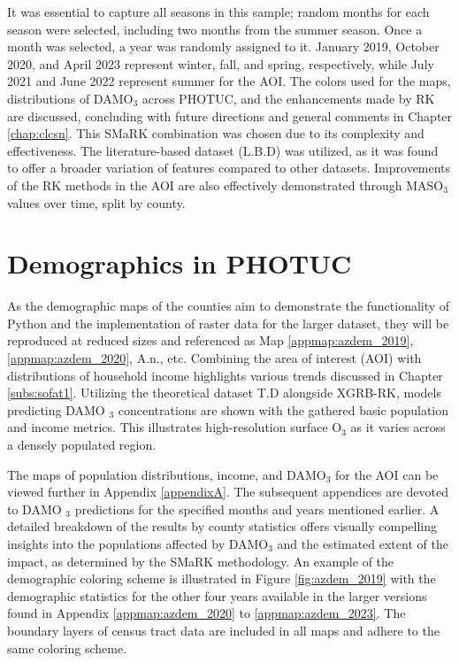 It was essential to capture all seasons in this sample; random months for each season were selected, including two months from the summer season. Once a month was selected, a year was randomly assigned to it. January 2019, October 2020, and April 2023 represent winter, fall, and spring, respectively, while July 2021 and June 2022 represent summer for the AOI. The colors used for the maps, distributions of DAMO$_3$ across PHOTUC, and the enhancements made by RK are discussed, concluding with future directions and general comments in Chapter \ref{chap:clcsn}. This SMaRK combination was chosen due to its complexity and effectiveness. The literature-based dataset (L.B.D) was utilized, as it was found to offer a broader variation of features compared to other datasets. Improvements of the RK methods in the AOI are also effectively demonstrated through MASO$_3$ values over time, split by county. 
\section{Demographics in PHOTUC} \label{discussion:colordesc} As the demographic maps of the counties aim to demonstrate the functionality of Python and the implementation of raster data for the larger dataset, they will be reproduced at reduced sizes and referenced as Map \ref{appmap:azdem_2019}, \ref{appmap:azdem_2020}, A.n., etc. Combining the area of interest (AOI) with distributions of household income highlights various trends discussed in Chapter \ref{subs:sofat1}. Utilizing the theoretical dataset T.D alongside XGRB-RK, models predicting DAMO $_3$ concentrations are shown with the gathered basic population and income metrics. This illustrates high-resolution surface O$_3$ as it varies across a densely populated region. 

The maps of population distributions, income, and DAMO$_3$ for the AOI can be viewed further in Appendix \ref{appendixA}. The subsequent appendices are devoted to DAMO $_3$ predictions for the specified months and years mentioned earlier. A detailed breakdown of the results by county statistics offers visually compelling insights into the populations affected by DAMO$_3$ and the estimated extent of the impact, as determined by the SMaRK methodology. An example of the demographic coloring scheme is illustrated in Figure \ref{fig:azdem_2019} with the demographic statistics for the other four years available in the larger versions found in Appendix \ref{appmap:azdem_2020} to \ref{appmap:azdem_2023}. The boundary layers of census tract data are included in all maps and adhere to the same coloring scheme. 

